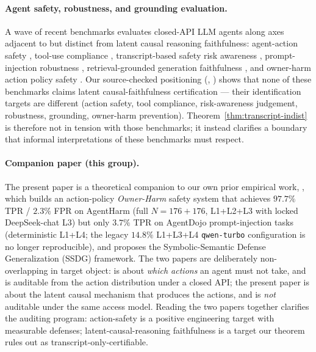 \documentclass{article}
\theoremstyle{plain}
\theoremstyle{definition}
\theoremstyle{remark}
\begin{document}
\paragraph{Agent safety, robustness, and grounding evaluation.}
A wave of recent benchmarks evaluates closed-API LLM agents along axes
adjacent to but distinct from latent causal reasoning faithfulness:
agent-action safety \citep{zhang2024agentsafetybench}, tool-use compliance
\citep{xiang2024guardagent}, transcript-based safety risk awareness
\citep{yuan2024rjudge}, prompt-injection robustness
\citep{debenedetti2024agentdojo}, retrieval-grounded generation
faithfulness \citep{murphy2025faithful}, and owner-harm action policy
safety \citep{zhang2026ownerharm}. Our source-checked positioning
(, ) shows that none of these
benchmarks claims latent causal-faithfulness certification --- their
identification targets are different (action safety, tool compliance,
risk-awareness judgement, robustness, grounding, owner-harm prevention).
Theorem~\ref{thm:transcript-indist} is therefore not in tension with those
benchmarks; it instead clarifies a boundary that informal interpretations
of these benchmarks must respect.

\paragraph{Companion paper (this group).}
The present paper is a theoretical companion to our own prior empirical
work, \citet{zhang2026ownerharm}, which builds an action-policy
\emph{Owner-Harm} safety system that achieves $97.7\%$ TPR / $2.3\%$
FPR on AgentHarm \citep{andriushchenko2025agentharm} (full
$N{=}176{+}176$, L1+L2+L3 with locked DeepSeek-chat L3) but only
$3.7\%$ TPR on AgentDojo prompt-injection tasks (deterministic L1+L4;
the legacy $14.8\%$ L1+L3+L4 \texttt{qwen-turbo} configuration is no
longer reproducible), and proposes the Symbolic-Semantic Defense
Generalization (SSDG) framework. The two papers are deliberately
non-overlapping in target object: \citet{zhang2026ownerharm} is about
\emph{which actions} an agent must not take, and is auditable from the
action distribution under a closed API; the present paper is about the
latent causal mechanism that produces the actions, and is \emph{not}
auditable under the same access model. Reading the two papers together
clarifies the auditing program: action-safety is a positive engineering
target with measurable defenses; latent-causal-reasoning faithfulness is
a target our theorem rules out as transcript-only-certifiable.
\end{document}
